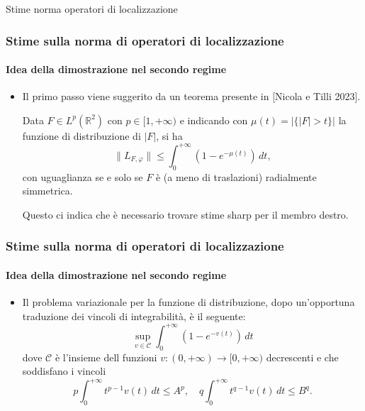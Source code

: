 \documentclass[aspectratio=141]{beamer}
\newcommand{\R}{\mathbb{R}} %
\begin{document}
\begin{section}{Stime norma operatori di localizzazione}
	\begin{frame}
		\frametitle{Stime sulla norma di operatori di localizzazione}
		\framesubtitle{Idea della dimostrazione nel secondo regime}
		\begin{itemize}
			\item Il primo passo viene suggerito da un teorema presente in [Nicola e Tilli 2023].
			\begin{myblock}[Teorema]
				Data $F \in L^p(\R^2)$ con $p \in [1,+\infty)$ e indicando con $\mu(t) = |\{|F|>t\}|$ la funzione di distribuzione di $|F|$, si ha
				\begin{equation*}
					\|L_{F,\varphi}\| \leq \int_{0}^{+\infty} (1-e^{-\mu(t)}) \, dt,
				\end{equation*}
				con uguaglianza se e solo se $F$ è (a meno di traslazioni) radialmente simmetrica.
			\end{myblock}
			Questo ci indica che è necessario trovare stime sharp per il membro destro.
		\end{itemize}
	\end{frame}

	\begin{frame}
		\frametitle{Stime sulla norma di operatori di localizzazione}
		\framesubtitle{Idea della dimostrazione nel secondo regime}
		\begin{itemize}
			\item Il problema variazionale per la funzione di distribuzione, dopo un'opportuna traduzione dei vincoli di integrabilità, è il seguente:
			\begin{equation*}
				\sup_{v \in \mathcal{C}} \int_0^{+\infty} (1-e^{-v(t)}) \, dt
			\end{equation*}
			dove $\mathcal{C}$ è l'insieme dell funzioni  $v : (0, +\infty) \rightarrow [0, +\infty)$ decrescenti e che soddisfano i vincoli
			\begin{equation*}
				p\int_{0}^{+\infty} t^{p-1} v(t) \, dt \leq A^p,\quad q\int_{0}^{+\infty} t^{q-1} v(t) \, dt \leq B^q .
			\end{equation*} 
		\end{itemize}
	\end{frame}


\end{section}
\end{document}
